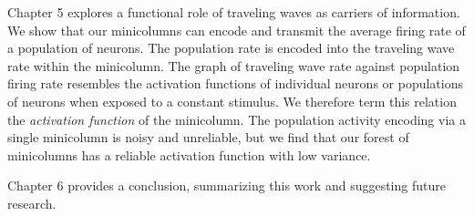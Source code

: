 Chapter 5 explores a functional role of traveling waves as carriers of information.
We show that our minicolumns can encode and transmit the average firing rate of a population of neurons.
The population rate is encoded into the traveling wave rate within the minicolumn.
The graph of traveling wave rate against population firing rate resembles the activation functions of individual neurons or 
populations of neurons when exposed to a constant stimulus.
We therefore term this relation the \textit{activation function} of the minicolumn.
The population activity encoding via a single minicolumn is noisy and unreliable,
but we find that our forest of minicolumns has a reliable activation function with low variance.

Chapter 6 provides a conclusion, summarizing this work and suggesting future research.


\endinput
